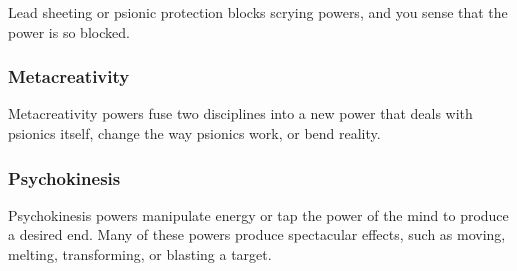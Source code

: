 Lead sheeting or psionic protection blocks scrying powers, and you sense that the power is so blocked.

\subsubsection{Metacreativity}
Metacreativity powers fuse two disciplines into a new power that deals with psionics itself, change the way psionics work, or bend reality.





\subsubsection{Psychokinesis}
Psychokinesis powers manipulate energy or tap the power of the mind to produce a desired end. Many of these powers produce spectacular effects, such as moving, melting, transforming, or blasting a target. %

